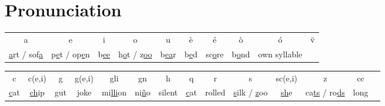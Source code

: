 \section*{Pronunciation}

\begin{tabular}{ccccccccc}
 a & e & i & o & u & \`{e} & \'{e} & \`{o} & \'{o} & \"{v} \\
\underline{a}rt / sof\underline{a} & p\underline{e}t / op\underline{e}n & b\underline{ee} & h\underline{o}t / z\underline{oo} & b\underline{ea}r & b\underline{e}d & sc\underline{o}re & b\underline{o}nd & own syllable \\
\end{tabular}

\begin{tabular}{cccccccccccccc}
 c & c(e,i) & g & g(e,i) & gli & gn & h & q & r & s & sc(e,i) & z & cc \\
\underline{c}at & \underline{ch}ip & \underline{g}ut & \underline{j}oke & mi\underline{lli}on & ni\underline{\~{n}}o & silent & \underline{c}at & rolled & \underline{s}ilk / \underline{z}oo & \underline{sh}e & ca\underline{ts} / ro\underline{ds} & long \\
\end{tabular}

